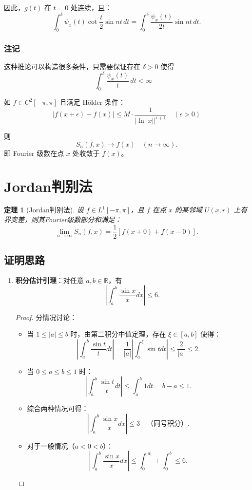 \documentclass[12pt]{article}
\newtheorem{theorem}{定理}  %
\begin{document}
因此，\( g(t) \) 在 \( t = 0 \) 处连续，且：
\[
\int_0^\delta \psi_x(t) \cot \frac{t}{2} \sin nt \, dt = \int_0^\delta \frac{\psi_x(t)}{2t} \sin nt \, dt.
\]
	

	
	\subsubsection{注记}
	这种推论可以构造很多条件，只需要保证存在 $\delta > 0$ 使得
\[
\int_{0}^{\delta} \frac{\psi_x(t)}{t} \, dt < \infty \quad 
\]

如 \( f \in C^2[-\pi, \pi] \) 且满足 Hölder 条件：
\[
|f(x+\epsilon) - f(x)| \leq M \cdot \frac{1}{\left|\ln|x|\right|^{\epsilon+1}} \quad (\epsilon > 0)
\]

则 
\[
S_n(f, x) \to f(x) \quad (n \to \infty).
\]
	即 Fourier 级数在点 $x$ 处收敛于 $f(x)$。
	
\section{Jordan判别法}

\begin{theorem}[Jordan判别法]
	设 $f \in L^1[-\pi, \pi]$，且 $f$ 在点 $x$ 的某邻域 $U(x,r)$ 上有界变差，则其Fourier级数部分和满足：
	\[
	\lim_{n \to \infty} S_n(f, x) = \frac{1}{2} \left[ f(x+0) + f(x-0) \right].
	\]
\end{theorem}

\subsection{证明思路}
\begin{enumerate}[leftmargin=2cm]
	\item \textbf{积分估计引理}：对任意 $a,b \in \mathbb{R}$，有
	\[
	\left| \int_a^b \frac{\sin x}{x} dx \right| \leq 6.
	\]
	
	\begin{proof}
		分情况讨论：
		\begin{itemize}
			\item 当 $1 \leq |a| \leq b$ 时，由第二积分中值定理，存在 $\xi \in [a,b]$ 使得：
			\[
			\left| \int_a^b \frac{\sin t}{t} dt \right| = \frac{1}{|a|} \left| \int_a^\xi \sin t dt \right| \leq \frac{2}{|a|} \leq 2.
			\]
			
			\item 当 $0 \leq a \leq b \leq 1$ 时：
			\[
			\left| \int_a^b \frac{\sin t}{t} dt \right| \leq \int_a^b 1 dt = b - a \leq 1.
			\]
			
			\item 综合两种情况可得：
			\[
			\left| \int_a^b \frac{\sin x}{x} dx \right| \leq 3 \quad \text{（同号积分）}.
			\]
			
			\item 对于一般情况（$a<0<b$）：
			\[
			\left| \int_a^b \frac{\sin x}{x} dx \right| \leq \int_0^{|a|} + \int_0^b \leq 6.
			\]
		\end{itemize}
	\end{proof}
\end{enumerate}
\end{document}

